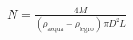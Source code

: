 \documentclass[preview]{standalone}
\begin{document}
\begin{align*}
N = \frac{4M}{(\rho_{\text{acqua}}-\rho_{\text{legno}})\,\pi D^2 L}
\end{align*}
\end{document}
